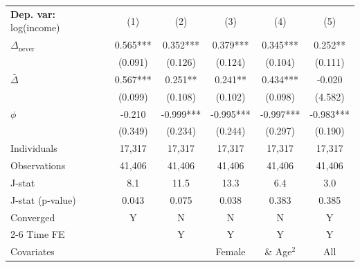 \begin{tabular}{l ccccc} \toprule  \textbf{Dep. var:}  log(income) 
                    &\multicolumn{1}{c}{(1)}   &\multicolumn{1}{c}{(2)}   &\multicolumn{1}{c}{(3)}   &\multicolumn{1}{c}{(4)}   &\multicolumn{1}{c}{(5)}   \\

\addlinespace
$\Delta_{\text{never}}$&       0.565***&       0.352***&       0.379***&       0.345***&       0.252** \\
                    &     (0.091)   &     (0.126)   &     (0.124)   &     (0.104)   &     (0.111)   \\

\addlinespace
$\bar{\Delta}$      &       0.567***&       0.251** &       0.241** &       0.434***&      -0.020   \\
                    &     (0.099)   &     (0.108)   &     (0.102)   &     (0.098)   &     (4.582)   \\

\addlinespace
$\phi$              &      -0.210   &      -0.999***&      -0.995***&      -0.997***&      -0.983***\\
                    &     (0.349)   &     (0.234)   &     (0.244)   &     (0.297)   &     (0.190)   \\
\addlinespace
Individuals         &      17,317   &      17,317   &      17,317   &      17,317   &      17,317   \\
Observations        &      41,406   &      41,406   &      41,406   &      41,406   &      41,406   \\
J-stat              &         8.1   &        11.5   &        13.3   &         6.4   &         3.0   \\
J-stat (p-value)    &       0.043   &       0.075   &       0.038   &       0.383   &       0.385   \\
Converged           &           Y   &           N   &           N   &           N   &           Y   \\
\cmidrule{2-6} Time FE & & Y & Y & Y & Y \\ Covariates & & & Female & \& Age$^2$ & All \\ \bottomrule \end{tabular}
